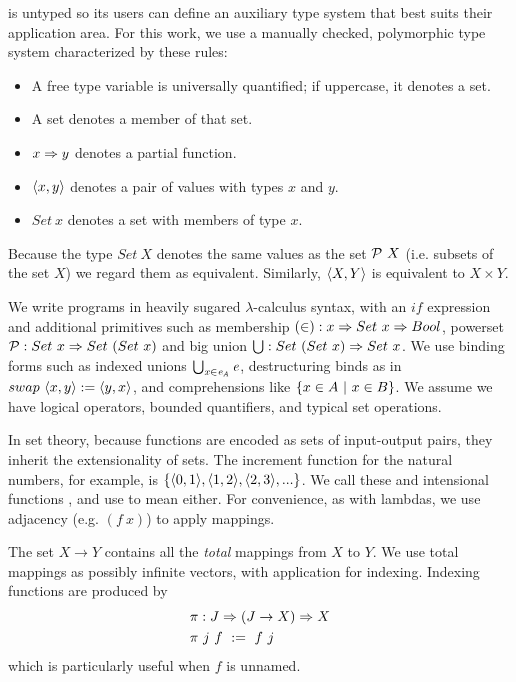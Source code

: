 \documentclass{llncs}
\begin{document}
\lzfclang is untyped so its users can define an auxiliary type system that best suits their application area.
For this work, we use a manually checked, polymorphic type system characterized by these rules:
\begin{itemize}
	\item A free type variable is universally quantified; if uppercase, it denotes a set.
	\item A set denotes a member of that set.
	\item $x \Rightarrow y$ denotes a partial function.
	\item $\langle{x,y}\rangle$ denotes a pair of values with types $x$ and $y$.
	\item $Set~x$ denotes a set with members of type $x$.
\end{itemize}
Because the type $Set~X$ denotes the same values as the set $\mathcal{P}~X$ (i.e. subsets of the set $X$) we regard them as equivalent.
Similarly, $\langle{X,Y}\rangle$ is equivalent to $X \times Y$.

We write \lzfclang programs in heavily sugared $\lambda$-calculus syntax, with an $if$ expression and additional primitives such as membership $(\in) : x \Rightarrow Set~x \Rightarrow Bool$, powerset $\mathcal{P} : Set~x \Rightarrow Set~(Set~x)$ and big union $\textstyle\bigcup : Set~(Set~x) \Rightarrow Set~x$.
We use binding forms such as indexed unions $\textstyle\bigcup_{\mathit{x} \in \mathit{e_A}}\mathit{e}$, destructuring binds as in $swap~\langle{x,y}\rangle := \langle{y,x}\rangle$, and comprehensions like $\lbrace {x \in A} \ \lvert\ {x \in B} \rbrace$.
We assume we have logical operators, bounded quantifiers, and typical set operations.

In set theory, because functions are encoded as sets of input-output pairs, they inherit the extensionality of sets.
The increment function for the natural numbers, for example, is $\{{\langle{0,1}\rangle,\langle{1,2}\rangle,\langle{2,3}\rangle,...}\}$.
We call these  and intensional functions , and use  to mean either.
For convenience, as with lambdas, we use adjacency (e.g. $(f~x)$) to apply mappings.

The set $X \to Y$ contains all the \emph{total} mappings from $X$ to $Y$.
We use total mappings as possibly infinite vectors, with application for indexing.
Indexing functions are produced by
\begin{equation}
\begin{aligned}
	&\pi : J \Rightarrow (J \to X) \Rightarrow X \\
	&\pi~j~f \ := \ f~j
\end{aligned}
\end{equation}
which is particularly useful when $f$ is unnamed.
\end{document}
